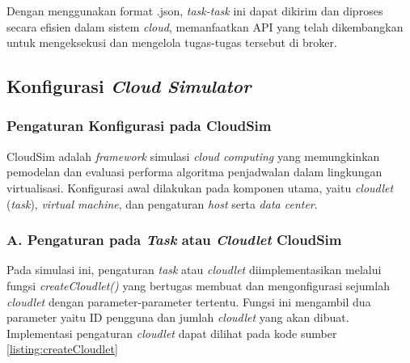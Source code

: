 Dengan menggunakan format .json, \textit{task-task} ini dapat dikirim dan diproses secara efisien dalam sistem \textit{cloud}, memanfaatkan API yang telah dikembangkan untuk mengeksekusi dan mengelola tugas-tugas tersebut di broker.

\subsection{Konfigurasi \textit{Cloud Simulator}}
\subsubsection{Pengaturan Konfigurasi pada CloudSim}
CloudSim adalah \textit{framework} simulasi \textit{cloud computing} yang memungkinkan pemodelan dan evaluasi performa algoritma penjadwalan dalam lingkungan virtualisasi. Konfigurasi awal dilakukan pada komponen utama, yaitu \textit{cloudlet} (\textit{task}), \textit{virtual machine}, dan pengaturan \textit{host} serta \textit{data center}.

\subsubsection{A. Pengaturan pada \textit{Task} atau \textit{Cloudlet} CloudSim}
Pada simulasi ini, pengaturan \textit{task} atau \textit{cloudlet} diimplementasikan melalui fungsi \textit{createCloudlet()} yang bertugas membuat dan mengonfigurasi sejumlah \textit{cloudlet} dengan parameter-parameter tertentu. Fungsi ini mengambil dua parameter yaitu ID pengguna dan jumlah \textit{cloudlet} yang akan dibuat. Implementasi pengaturan \textit{cloudlet} dapat dilihat pada kode sumber \ref{listing:createCloudlet}

